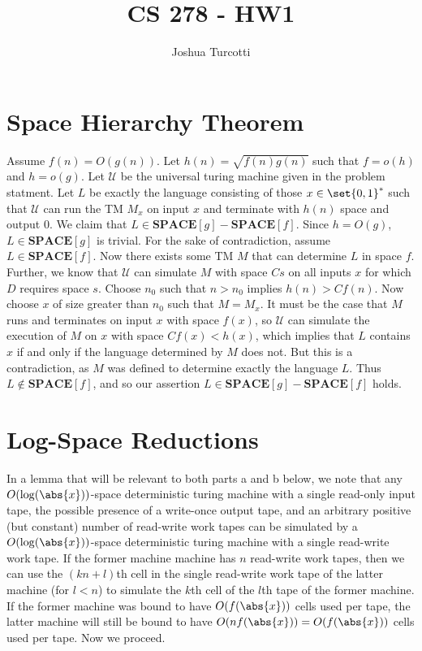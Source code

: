 \documentclass{article}
\title{CS 278 - HW1}
\author{Joshua Turcotti}
\begin{document}
\maketitle

\section{Space Hierarchy Theorem}

\renewcommand{\L}{\mathbf{L}}
\newcommand{\NL}{\mathbf{NL}}
\newcommand{\coNL}{\mathbf{coNL}}
\newcommand{\NSP}{\mathbf{NSPACE}}
\newcommand{\coNSP}{\mathbf{coNSPACE}}
\newcommand{\U}{\mathcal{U}}
\newcommand{\SP}{\mathbf{SPACE}}

Assume $f(n) = O(g(n))$. Let $h(n) = \sqrt{f(n)g(n)}$ such that $f = o(h)$ and $h = o(g)$. Let $\U$ be the universal turing machine given in the problem statment. Let $L$ be exactly the language consisting of those $x \in \set{0, 1}^*$ such that $\U$ can run the TM $M_x$ on input $x$ and terminate with $h(n)$ space and output 0. We claim that $L \in \SP[g] - \SP[f]$. Since $h = O(g)$, $L \in \SP[g]$ is trivial. For the sake of contradiction, assume $L \in \SP[f]$. Now there exists some TM $M$ that can determine $L$ in space $f$. Further, we know that $\U$ can simulate $M$ with space $Cs$ on all inputs $x$ for which $D$ requires space $s$. Choose $n_0$ such that $n > n_0$ implies $h(n) > Cf(n)$. Now choose $x$ of size greater than $n_0$ such that $M = M_x$. It must be the case that $M$ runs and terminates on input $x$ with space $f(x)$, so $\U$ can simulate the execution of $M$ on $x$ with space $Cf(x) < h(x)$, which implies that $L$ contains $x$ if and only if the language determined by $M$ does not. But this is a contradiction, as $M$ was defined to determine exactly the language $L$. Thus $L \not \in \SP[f]$, and so our assertion $L \in \SP[g] - \SP[f]$ holds.

\section{Log-Space Reductions}

In a lemma that will be relevant to both parts a and b below, we note that any $O(\log(\abs{x}))$-space deterministic turing machine with a single read-only input tape, the possible presence of a write-once output tape, and an arbitrary positive (but constant) number of read-write work tapes can be simulated by a $O(\log(\abs{x}))$-space deterministic turing machine with a single read-write work tape. If the former machine machine has $n$ read-write work tapes, then we can use the $(kn+l)$th cell in the single read-write work tape of the latter machine (for $l < n$) to simulate the $k$th cell of the $l$th tape of the former machine. If the former machine was bound to have $O(f(\abs{x}))$ cells used per tape, the latter machine will still be bound to have $O(nf(\abs{x})) = O(f(\abs{x}))$ cells used per tape. Now we proceed.
\end{document}
